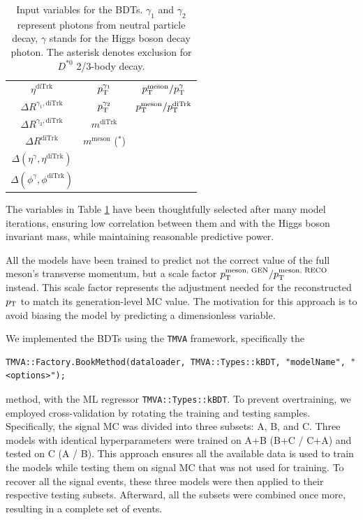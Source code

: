 \begin{myitemlist}
\begin{table}[!ht]
\begin{tabular}{|c|c|c|}
            $\eta^{\text{diTrk}}$                           &$p_\text{T}^{\gamma_1}$       &$p_\text{T}^{\text{meson}}/p_\text{T}^{\gamma}$          \\
            $\Delta R^{\gamma_1, \text{diTrk}}$             &$p_\text{T}^{\gamma_2}$       &$p_\text{T}^{\text{meson}}/p_\text{T}^{\text{diTrk}}$    \\
            $\Delta R^{\gamma_2, \text{diTrk}}$             &$m^{\text{diTrk}}$     &           \\
            $\Delta R^{\text{diTrk}}$                       &$m^{\text{meson}}$ ($^*$)  &       \\
            $\Delta(\eta^{\gamma}, \eta^{\text{diTrk}})$    & & \\
            $\Delta(\phi^{\gamma}, \phi^{\text{diTrk}})$    & & \\
            \hline
        \end{tabular}
        \caption{Input variables for the BDTs. $\gamma_1$ and $\gamma_2$ represent photons from neutral particle decay, $\gamma$ stands for the Higgs boson decay photon. The asterisk denotes exclusion for $D^{*0}$ 2/3-body decay.}
        \label{tab:model_variables}
    \end{table}

    The variables in Table \ref{tab:model_variables} have been thoughtfully selected after many model iterations, ensuring low correlation between them and with the Higgs boson invariant mass, while maintaining reasonable predictive power.

    All the models have been trained to predict not the correct value of the full meson's transverse momentum, but a scale factor $p_\text{T}^{\text{meson, GEN}}/p_\text{T}^{\text{meson, RECO}}$ instead. This scale factor represents the adjustment needed for the reconstructed $p_\text{T}$ to match its generation-level MC value. The motivation for this approach is to avoid biasing the model by predicting a dimensionless variable.

    We implemented the BDTs using the \verb+TMVA+ framework, specifically the
\begin{small}
\vspace*{-5pt}
\begin{verbatim}
TMVA::Factory.BookMethod(dataloader, TMVA::Types::kBDT, "modelName", "<options>");
\end{verbatim}
\vspace*{-5pt}
\end{small}
    method, with the ML regressor \verb+TMVA::Types::kBDT+. To prevent overtraining, we employed cross-validation by rotating the training and testing samples. Specifically, the signal MC was divided into three subsets: A, B, and C. Three models with identical hyperparameters were trained on A+B (B+C / C+A) and tested on C (A / B). This approach ensures all the available data is used to train the models while testing them on signal MC that was not used for training. To recover all the signal events, these three models were then applied to their respective testing subsets. Afterward, all the subsets were combined once more, resulting in a complete set of events.


\end{myitemlist}
